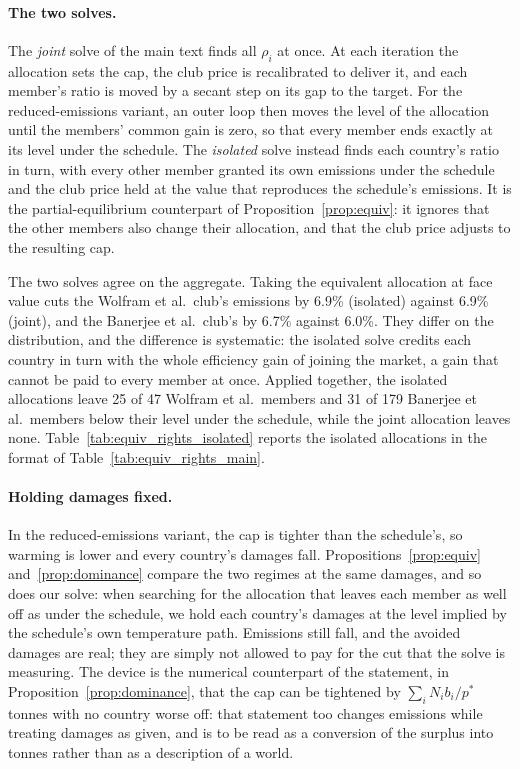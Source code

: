 \documentclass[12pt,english]{article}
\theoremstyle{remark}
\begin{document}
\paragraph{The two solves.} The \emph{joint} solve of the main text finds all $\rho_i$ at once. At each iteration the allocation sets the cap, the club price is recalibrated to deliver it, and each member's ratio is moved by a secant step on its gap to the target. For the reduced-emissions variant, an outer loop then moves the level of the allocation until the members' common gain is zero, so that every member ends exactly at its level under the schedule. The \emph{isolated} solve instead finds each country's ratio in turn, with every other member granted its own emissions under the schedule and the club price held at the value that reproduces the schedule's emissions. It is the partial-equilibrium counterpart of Proposition~\ref{prop:equiv}: it ignores that the other members also change their allocation, and that the club price adjusts to the resulting cap.

The two solves agree on the aggregate. Taking the equivalent allocation at face value cuts the Wolfram et al.\ club's emissions by 6.9\% (isolated) against 6.9\% (joint), and the Banerjee et al.\ club's by 6.7\% against 6.0\%. They differ on the distribution, and the difference is systematic: the isolated solve credits each country in turn with the whole efficiency gain of joining the market, a gain that cannot be paid to every member at once. Applied together, the isolated allocations leave 25 of 47 Wolfram et al.\ members and 31 of 179 Banerjee et al.\ members below their level under the schedule, while the joint allocation leaves none. Table~\ref{tab:equiv_rights_isolated} reports the isolated allocations in the format of Table~\ref{tab:equiv_rights_main}.

\paragraph{Holding damages fixed.} In the reduced-emissions variant, the cap is tighter than the schedule's, so warming is lower and every country's damages fall. Propositions~\ref{prop:equiv} and~\ref{prop:dominance} compare the two regimes at the same damages, and so does our solve: when searching for the allocation that leaves each member as well off as under the schedule, we hold each country's damages at the level implied by the schedule's own temperature path. Emissions still fall, and the avoided damages are real; they are simply not allowed to pay for the cut that the solve is measuring. The device is the numerical counterpart of the statement, in Proposition~\ref{prop:dominance}, that the cap can be tightened by $\sum_i N_i b_i/p^*$ tonnes with no country worse off: that statement too changes emissions while treating damages as given, and is to be read as a conversion of the surplus into tonnes rather than as a description of a world.
\end{document}
